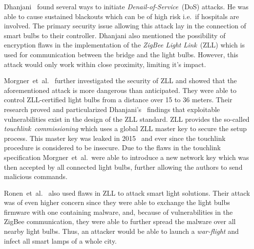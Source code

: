 \documentclass[11pt,a4paper]{article}
\begin{document}
	Dhanjani~\cite{Dhanjani:2013:HLSEPHPWLS} found several ways to initiate \textit{Denail-of-Service}~(DoS) attacks.
	He was able to cause sustained blackouts which can be of high risk i.e.\ if hospitals are involved.
	The primary security issue allowing this attack lay in the connection of smart bulbs to their controller.
	Dhanjani also mentioned the possibility of encryption flaws in the implementation of the \textit{ZigBee Light Link}~(ZLL) which is used for communication between the bridge and the light bulbs. However, this attack would only work within close proximity, limiting it's impact.

	Morgner~et~al.~\cite{Morgner:2016:AYBBUICSSCLS} further investigated the security of ZLL and showed that the aforementioned attack is more dangerous than anticipated.
	They were able to control ZLL-certified light bulbs from a distance over 15 to 36 meters.
	Their research proved and particularized Dhanjani's~\cite{Dhanjani:2013:HLSEPHPWLS} findings that exploitable vulnerabilities exist in the design of the ZLL standard.
    ZLL provides the so-called \textit{touchlink~commissioning} which uses a global ZLL master key to secure the setup process.
    This master key was leaked in 2015~\cite{Morgner:2016:AYBBUICSSCLS} and ever since the touchlink procedure is considered to be insecure.
    Due to the flaws in the touchlink specification Morgner~et~al.\ were able to introduce a new network key which was then accepted by all connected light bulbs, further allowing the authors to send malicious commands.

	Ronen~et~al.~\cite{Ronen:2018:IGNCZCR} also used flaws in ZLL to attack smart light solutions.
	Their attack was of even higher concern since they were able to exchange the light bulbs firmware with one containing malware, and, because of vulnerabilities in the ZigBee communication, they were able to further spread the malware over all nearby light bulbs.
	Thus, an attacker would be able to launch a \textit{war-flight} and infect all smart lamps of a whole city.

\end{document}
